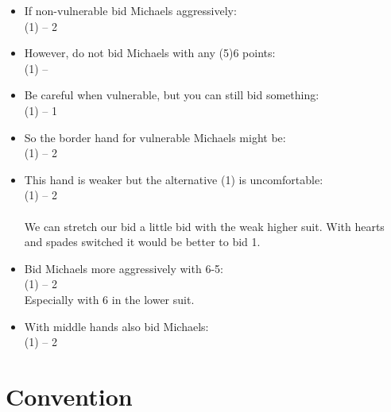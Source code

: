 \documentclass[12pt, a4paper]{article}
\begin{document}
\begin{itemize}

    \item
If non-vulnerable bid Michaels aggressively:\\
(1\clubs) -- 2\\

\item
However, do not bid Michaels with any (5)6 points:\\
(1\clubs) -- \\

\item
Be careful when vulnerable, but you can still bid something:\\
(1\clubs) -- 1\\

\item
So the border hand for vulnerable Michaels might be:\\
(1\clubs) -- 2\\

\item
This hand is weaker but the alternative (1\spades) is uncomfortable:\\
(1\clubs) -- 2\\
\\
We can stretch our bid a little bid with the
weak higher suit. With hearts and spades switched
it would be better to bid 1\spades.

\item
Bid Michaels more aggressively with 6-5:\\
(1\clubs) -- 2\\
Especially with 6 in the lower suit.

\item
With middle hands also bid Michaels:\\
(1\clubs) -- 2\clubs\\

\end{itemize}


\section{Convention}
\end{document}
